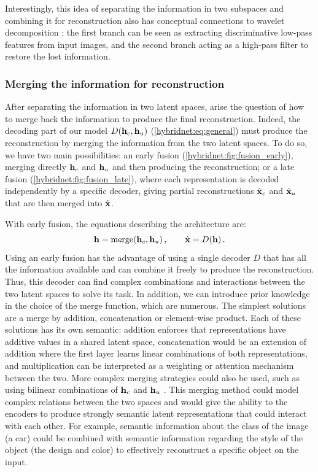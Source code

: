 Interestingly, this idea of separating the information in two subspaces and combining it for reconstruction also has conceptual connections to wavelet decomposition \citep{wavelets}: the first branch can be seen as extracting discriminative low-pass features from input images, and the second branch acting as a high-pass filter to restore the lost information.

\subsubsection{Merging the information for reconstruction}

After separating the information in two latent spaces, arise the question of how to merge back the information to produce the final reconstruction. Indeed, the decoding part of our model $D(\mathbf{h}_c, \mathbf{h}_u)$ (\cf \autoref{hybridnet:eq:general}) must produce the reconstruction by merging the information from the two latent spaces. To do so, we have two main possibilities: an early fusion (\cf \autoref{hybridnet:fig:fusion_early}), merging directly $\mathbf{h}_c$ and $\mathbf{h}_u$ and then producing the reconstruction; or a late fusion (\cf \autoref{hybridnet:fig:fusion_late}), where each representation is decoded independently by a specific decoder, giving partial reconstructions $\hat{\mathbf{x}}_c$ and $\hat{\mathbf{x}}_u$ that are then merged into $\hat{\mathbf{x}}$.

With early fusion, the equations describing the architecture are:
\begin{equation}
  \mathbf{h} = \mathrm{merge}(\mathbf{h}_c, \mathbf{h}_u)\,, \qquad \hat{\mathbf{x}} = D(\mathbf{h})\,.
\end{equation}
Using an early fusion has the advantage of using a single decoder $D$ that has all the information available and can combine it freely to produce the reconstruction. Thus, this decoder can find complex combinations and interactions between the two latent spaces to solve its task. In addition, we can introduce prior knowledge in the choice of the $\mathrm{merge}$ function, which are numerous. The simplest solutions are a merge by addition, concatenation or element-wise product. Each of these solutions has its own semantic: addition enforces that representations have additive values in a shared latent space, concatenation would be an extension of addition where the first layer learns linear combinations of both representations, and multiplication can be interpreted as a weighting or attention mechanism between the two. More complex merging strategies could also be used, such as using bilinear combinations of $\mathbf{h}_c$ and $\mathbf{h}_u$ \citep{benyounescadene2017mutan,paumard2018jigsaw}. This merging method could model complex relations between the two spaces and would give the ability to the encoders to produce strongly semantic latent representations that could interact with each other. For example, semantic information about the class of the image (\eg a car) could be combined with semantic information regarding the style of the object (\eg the design and color) to effectively reconstruct a specific object on the input.

